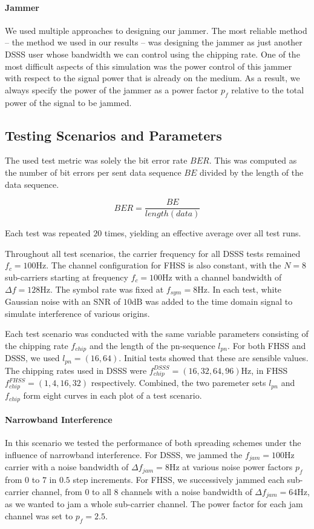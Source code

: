 	\paragraph{Jammer}
	We used multiple approaches to designing our jammer. The most reliable method -- the method we used in our results -- was designing the jammer as just another DSSS user whose bandwidth we can control using the chipping rate. One of the most difficult aspects of this simulation was the power control of this jammer with respect to the signal power that is already on the medium. As a result, we always specify the power of the jammer as a power factor $p_f$ relative to the total power of the signal to be jammed.
	
	\subsection{Testing Scenarios and Parameters}
	The used test metric was solely the bit error rate $BER$. This was computed as the number of bit errors per sent data sequence $BE$ divided by the length of the data sequence.
	
	\[
		BER = \frac{BE}{length(data)}
	\]
	
	Each test was repeated $20$ times, yielding an effective average over all test runs.
	
	Throughout all test scenarios, the carrier frequency for all DSSS tests remained $f_c = 100\text{Hz}$. The channel configuration for FHSS is also constant, with the $N=8$ sub-carriers starting at frequency $f_c = 100\text{Hz}$ with a channel bandwidth of $\Delta f = 128 \text{Hz}$. The symbol rate was fixed at $f_{sym} = 8\text{Hz}$. In each test, white Gaussian noise with an SNR of $10\text{dB}$ was added to the time domain signal to simulate interference of various origins.
	
	Each test scenario was conducted with the same variable parameters consisting of the chipping rate $f_{chip}$ and the length of the pn-sequence $l_{pn}$. For both FHSS and DSSS, we used $l_{pn} = (16, 64)$. Initial tests showed that these are sensible values. The chipping rates used in DSSS were $f_{chip}^{DSSS} = (16,32,64,96)\text{Hz}$, in FHSS $f_{chip}^{FHSS} = (1, 4, 16, 32)$ respectively. Combined, the two paremeter sets $l_{pn}$ and $f_{chip}$ form eight curves in each plot of a test scenario.
	
	\paragraph{Narrowband Interference}
	In this scenario we tested the performance of both spreading schemes under the influence of narrowband interference. For DSSS, we jammed the $f_{jam} = 100\text{Hz}$ carrier with a noise bandwidth of $\Delta f_{jam} = 8\text{Hz}$ at various noise power factors $p_f$ from $0$ to $7$ in $0.5$ step increments. For FHSS, we successively jammed each sub-carrier channel, from $0$ to all $8$ channels with a noise bandwidth of $\Delta f_{jam} = 64\text{Hz}$, as we wanted to jam a whole sub-carrier channel. The power factor for each jam channel was set to $p_f = 2.5$.
	
